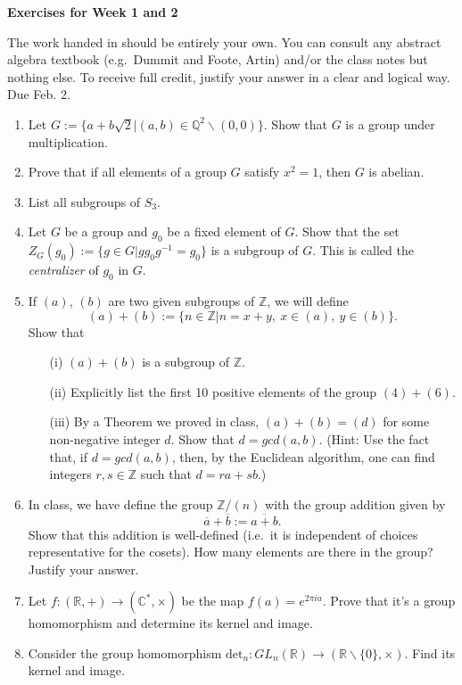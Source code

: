 \documentclass[12pt]{article}
\title{}
\date{}
\theoremstyle{plain}
\theoremstyle{definition}
\theoremstyle{remark}
\newcommand{\Z}{\mathbb{Z}}
\newcommand{\R}{\mathbb{R}}
\newcommand{\lra}{\longrightarrow}
\begin{document}
\begin{center}
{\Large \bf Exercises for Week 1 and 2}
\end{center}
The work handed in should be entirely your own. You can consult any abstract algebra textbook (e.g.~Dummit and Foote, Artin) and/or the class notes but nothing else. To receive full credit, justify your answer in a clear and logical way. Due Feb. 2.

\begin{enumerate}
\item Let $G:=\{a+b\sqrt{2}|(a,b)\in \mathbb{Q}^2\backslash (0,0)\}$. Show that $G$ is a group under multiplication.

\item Prove that if all elements of a group $G$ satisfy $x^2=1$, then $G$ is abelian.

\item List all subgroups of $S_3$.

\item Let $G$ be a group and $g_0$ be a fixed element of $G$. Show that the set $Z_G(g_0):=\{g\in G|gg_0g^{-1}=g_0\}$ is a subgroup of $G$. This is called the \emph{centralizer} of $g_0$ in $G$.

\item If $(a)$, $(b)$ are two given subgroups of $\Z$, we will define
\[
(a)+(b):=\{n\in \Z|n=x+y,~x\in (a),~y\in (b) \}.
\]
Show that 
\begin{itemize}
\item[(i)] $(a)+(b)$ is a subgroup of $\Z$.
\item[(ii)] Explicitly list the first 10 positive elements of the group $(4)+(6)$.
\item[(iii)] By a Theorem we proved in class, $(a)+(b)=(d)$ for some non-negative integer $d$. Show that $d=gcd(a,b)$. (Hint: Use the fact that, if $d=gcd(a,b)$, then, by the Euclidean algorithm, one can find integers $r,s\in \Z$ such that $d=ra+sb$.)
\end{itemize}

\item In class, we have define the group $\Z/(n)$ with the group addition given by
\[
\overline{a}+\overline{b}:=\overline{a+b}.
\] 
Show that this addition is well-defined (i.e.~it is independent of choices representative for the cosets). How many elements are there in the group? Justify your answer. 

\item Let $f:(\mathbb{R},+)\to (\mathbb{C}^*,\times)$ be the map $f(a)=e^{2\pi i a}$. Prove that it's a group homomorphism and determine its kernel and image.

\item Consider the group homomorphism $\mathrm{det}_n: GL_n(\R)\lra (\R\backslash \{0\},\times)$. Find its kernel and image.
\end{enumerate}
\end{document}
